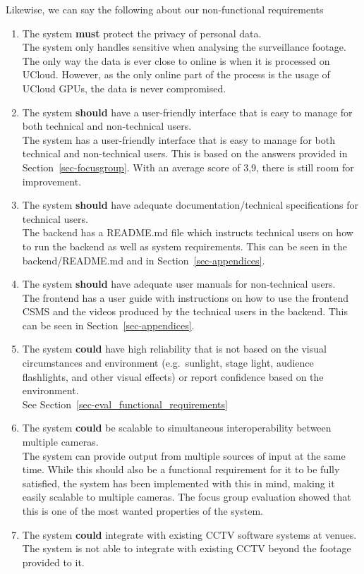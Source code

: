 \documentclass[
]{article}
\begin{document}
Likewise, we can say the following about our non-functional requirements

\begin{enumerate}
\def\labelenumi{\arabic{enumi}.}
\item
  The system \textbf{must} protect the privacy of personal data.\\
  The system only handles sensitive when analysing the surveillance
  footage. The only way the data is ever close to online is when it is
  processed on UCloud. However, as the only online part of the process
  is the usage of UCloud GPUs, the data is never compromised.
\item
  The system \textbf{should} have a user-friendly interface that is easy
  to manage for both technical and non-technical users.\\
  The system has a user-friendly interface that is easy to manage for
  both technical and non-technical users. This is based on the answers
  provided in Section~\ref{sec-focusgroup}. With an average score of
  3,9, there is still room for improvement.
\item
  The system \textbf{should} have adequate documentation/technical
  specifications for technical users.\\
  The backend has a README.md file which instructs technical users on
  how to run the backend as well as system requirements. This can be
  seen in the backend/README.md and in Section~\ref{sec-appendices}.
\item
  The system \textbf{should} have adequate user manuals for
  non-technical users.\\
  The frontend has a user guide with instructions on how to use the
  frontend CSMS and the videos produced by the technical users in the
  backend. This can be seen in Section~\ref{sec-appendices}.
\item
  The system \textbf{could} have high reliability that is not based on
  the visual circumstances and environment (e.g.~sunlight, stage light,
  audience flashlights, and other visual effects) or report confidence
  based on the environment.\\
  See Section~\ref{sec-eval_functional_requirements}
\item
  The system \textbf{could} be scalable to simultaneous interoperability
  between multiple cameras.\\
  The system can provide output from multiple sources of input at the
  same time. While this should also be a functional requirement for it
  to be fully satisfied, the system has been implemented with this in
  mind, making it easily scalable to multiple cameras. The focus group
  evaluation showed that this is one of the most wanted properties of
  the system.
\item
  The system \textbf{could} integrate with existing CCTV software
  systems at venues.\\
  The system is not able to integrate with existing CCTV beyond the
  footage provided to it.
\end{enumerate}
\end{document}
